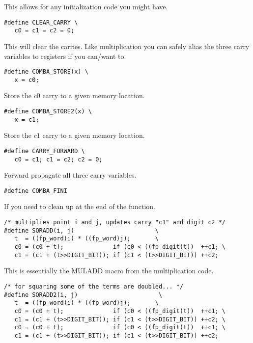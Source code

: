 \documentclass[b5paper]{book}
\begin{document}
This allows for any initialization code you might have.  

\begin{verbatim}
#define CLEAR_CARRY \
   c0 = c1 = c2 = 0;
\end{verbatim}

This will clear the carries.  Like multiplication you can safely alias the three carry variables
to registers if you can/want to.

\begin{verbatim}
#define COMBA_STORE(x) \
   x = c0;
\end{verbatim}

Store the $c0$ carry to a given memory location.

\begin{verbatim}
#define COMBA_STORE2(x) \
   x = c1;
\end{verbatim}

Store the $c1$ carry to a given memory location.

\begin{verbatim}
#define CARRY_FORWARD \
   c0 = c1; c1 = c2; c2 = 0;
\end{verbatim}

Forward propagate all three carry variables.

\begin{verbatim}
#define COMBA_FINI
\end{verbatim}

If you need to clean up at the end of the function.

\begin{verbatim}
/* multiplies point i and j, updates carry "c1" and digit c2 */
#define SQRADD(i, j)                       \
   t  = ((fp_word)i) * ((fp_word)j);       \
   c0 = (c0 + t);              if (c0 < ((fp_digit)t))  ++c1; \
   c1 = (c1 + (t>>DIGIT_BIT)); if (c1 < (t>>DIGIT_BIT)) ++c2; 
\end{verbatim}

This is essentially the MULADD macro from the multiplication code.

\begin{verbatim}
/* for squaring some of the terms are doubled... */
#define SQRADD2(i, j)                       \
   t  = ((fp_word)i) * ((fp_word)j);       \
   c0 = (c0 + t);              if (c0 < ((fp_digit)t))  ++c1; \
   c1 = (c1 + (t>>DIGIT_BIT)); if (c1 < (t>>DIGIT_BIT)) ++c2; \
   c0 = (c0 + t);              if (c0 < ((fp_digit)t))  ++c1; \
   c1 = (c1 + (t>>DIGIT_BIT)); if (c1 < (t>>DIGIT_BIT)) ++c2; 
\end{verbatim}
\end{document}
